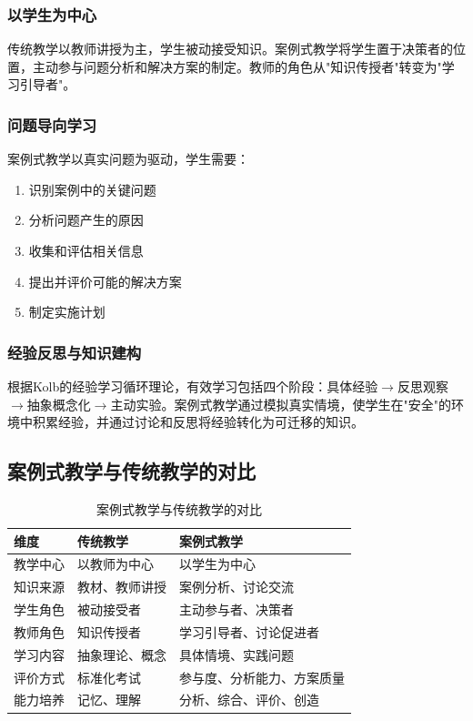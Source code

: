 \documentclass[12pt,a4paper]{ctexart}
\begin{document}
\subsubsection{以学生为中心}

传统教学以教师讲授为主，学生被动接受知识。案例式教学将学生置于决策者的位置，主动参与问题分析和解决方案的制定。教师的角色从"知识传授者"转变为"学习引导者"。

\subsubsection{问题导向学习}

案例式教学以真实问题为驱动，学生需要：
\begin{enumerate}[leftmargin=2em]
    \item 识别案例中的关键问题
    \item 分析问题产生的原因
    \item 收集和评估相关信息
    \item 提出并评价可能的解决方案
    \item 制定实施计划
\end{enumerate}

\subsubsection{经验反思与知识建构}

根据Kolb的经验学习循环理论，有效学习包括四个阶段：具体经验$\rightarrow$反思观察$\rightarrow$抽象概念化$\rightarrow$主动实验。案例式教学通过模拟真实情境，使学生在"安全"的环境中积累经验，并通过讨论和反思将经验转化为可迁移的知识。

\subsection{案例式教学与传统教学的对比}

\begin{table}[htbp]
\centering
\caption{案例式教学与传统教学的对比}
\begin{tabular}{p{3cm}p{5cm}p{5cm}}
\toprule
\textbf{维度} & \textbf{传统教学} & \textbf{案例式教学} \\
\midrule
教学中心 & 以教师为中心 & 以学生为中心 \\
知识来源 & 教材、教师讲授 & 案例分析、讨论交流 \\
学生角色 & 被动接受者 & 主动参与者、决策者 \\
教师角色 & 知识传授者 & 学习引导者、讨论促进者 \\
学习内容 & 抽象理论、概念 & 具体情境、实践问题 \\
评价方式 & 标准化考试 & 参与度、分析能力、方案质量 \\
能力培养 & 记忆、理解 & 分析、综合、评价、创造 \\
\bottomrule
\end{tabular}
\end{table}
\end{document}
